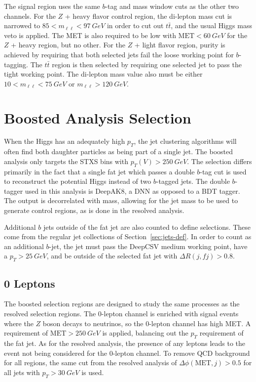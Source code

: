 The signal region uses the same $b$-tag and mass window cuts as the other two channels.
For the $Z$ + heavy flavor control region,
the di-lepton mass cut is narrowed to $85 < m_{\ell\ell} < \SI{97}{GeV}$
in order to cut out $t\bar{t}$, and the usual Higgs mass veto is applied.
The MET is also required to be low with $\mathrm{MET} < \SI{60}{GeV}$
for the $Z$ + heavy region, but no other.
For the $Z$ + light flavor region, purity is achieved by requiring
that both selected jets fail the loose working point for $b$-tagging.
The $t\bar{t}$ region is then selected by requiring
one selected jet to pass the tight working point.
The di-lepton mass value also must be either $10 < m_{\ell\ell} < \SI{75}{GeV}$
or $m_{\ell\ell} > \SI{120}{GeV}$.

\section{Boosted Analysis Selection}

When the Higgs has an adequately high $p_T$,
the jet clustering algorithms will often find both daughter particles
as being part of a single jet.
The boosted analysis only targets the STXS bins with $p_T(V) > \SI{250}{GeV}$.
The selection differs primarily in the fact that a single fat jet
which passes a double $b$-tag cut \cite{Sirunyan_2018}
is used to reconstruct the potential Higgs instead of two $b$-tagged jets.
The double $b$-tagger used in this analysis is DeepAK8,
a DNN as opposed to a BDT tagger.
The output is decorrelated with mass, allowing for the jet mass to be used
to generate control regions, as is done in the resolved analysis.

Additional $b$ jets outside of the fat jet are also counted to define selections.
These come from the regular jet collections of Section~\ref{sec:jets-def}.
In order to count as an additional $b$-jet,
the jet must pass the DeepCSV medium working point,
have a $p_T > \SI{25}{GeV}$, and be outside of the selected fat jet
with $\Delta R(j, f\!j) > 0.8$.

\subsection{0 Leptons}

The boosted selection regions are designed to study the same processes
as the resolved selection regions.
The 0-lepton channel is enriched with signal events where
the $Z$ boson decays to neutrinos, so the 0-lepton channel has high MET.
A requirement of $\mathrm{MET} > \SI{250}{GeV}$ is applied,
balancing out the $p_T$ requirement of the fat jet.
As for the resolved analysis, the presence of any leptons leads to
the event not being considered for the 0-lepton channel.
To remove QCD background for all regions, the same cut from the resolved analysis of
$\Delta \phi(\mathrm{MET}, j) > 0.5$ for all jets with $p_T > \SI{30}{GeV}$ is used.

